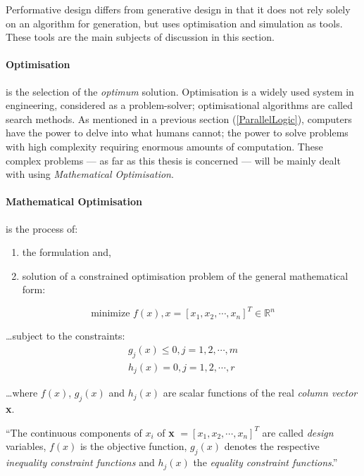 Performative design differs from generative design in that it does not rely solely on an algorithm for generation, but uses optimisation and simulation as tools. These tools are the main subjects of discussion in this section.

\paragraph{Optimisation}is the selection of the \emph{optimum} solution. Optimisation is a widely used system in engineering, considered as a problem-solver; optimisational algorithms are called search methods. As mentioned in a previous section (\ref{ParallelLogic}), computers have the power to delve into what humans cannot; the power to solve problems with high complexity requiring enormous amounts of computation. These complex problems --- as far as this thesis is concerned --- will be mainly dealt with using \emph{Mathematical Optimisation}.

\newpage
\paragraph{Mathematical Optimisation} is the process of:
\vspace{-0.5cm}
\begin{enumerate}
\item the formulation and,
\item solution of a constrained optimisation problem of the general mathematical form:
\end{enumerate}
\vspace{-0.9cm}

\begin{equation}
\text{minimize }f(x),x=[x_1,x_2,\cdots,x_n]^T \in \mathbb{R}^n
\label{OptMathForm}
\end{equation}

\ldots subject to the constraints:
\begin{equation}
\begin{split}
g_j(x)\leq 0, j=1,2,\cdots,m \\
h_j(x)=0, j=1,2,\cdots,r
\label{OptConstr}
\end{split}
\end{equation}

\ldots where $f(x)$, $g_j(x)$ and $h_j(x)$ are scalar functions of the real \emph{column vector} \textbf{x}. \cite{snyman05}

``The continuous components of $x_i$ of \textbf{x} $=[x_1,x_2,\cdots,x_n]^T$ are called \emph{design} variables, $f(x)$ is the objective function, $g_j(x)$ denotes the respective \emph{inequality constraint functions} and $h_j(x)$ the \emph{equality constraint functions}.'' \cite{snyman05}

